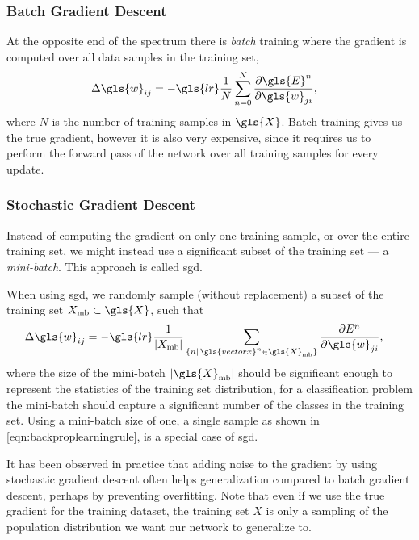 \documentclass[thesis]{subfiles}
\begin{document}
\subsubsection{Batch Gradient Descent}
At the opposite end of the spectrum there is \emph{batch} training where the gradient is computed over all data samples in the training set,
\begin{equation}
\begin{aligned}
    \Delta \gls{w}_{ij} &= -\gls{lr}\frac{1}{N} \sum^N_{n=0} \frac{\partial \gls{E}^n}{\partial \gls{w}_{ji}},
     \label{eqn:batchlearningrule}
\end{aligned}
\end{equation}
%
where $N$ is the number of training samples in $\gls{X}$. Batch training gives us the true gradient, however it is also very expensive, since it requires us to perform the forward pass of the network over all training samples for every update. 

\subsubsection{Stochastic Gradient Descent}
Instead of computing the gradient on only one training sample, or over the entire training set, we might instead use a significant subset of the training set --- a \emph{mini-batch}. This approach is called \gls{sgd}.

When using \gls{sgd}, we randomly sample (without replacement) a subset of the training set $X_{\textrm{mb}} \subset \gls{X}$, such that
\begin{equation}
\begin{aligned}
    \Delta \gls{w}_{ij} &= -\gls{lr} \frac{1}{|X_{\textrm{mb}}|} \sum_{\{n|\,\gls{vectorx}^n \in \gls{X}_{\textrm{mb}}\}} \frac{\partial E^n}{\partial \gls{w}_{ji}},
     \label{eqn:sgdrule}
\end{aligned}
\end{equation}
where the size of the mini-batch $|\gls{X}_{\textrm{mb}}|$ should be significant enough to represent the statistics of the training set distribution, \ie for a classification problem the mini-batch should capture a significant number of the classes in the training set. Using a mini-batch size of one, \ie a single sample as shown in \cref{eqn:backproplearningrule}, is a special case of \gls{sgd}. 

It has been observed in practice that adding noise to the gradient by using stochastic gradient descent often helps generalization compared to batch gradient descent, perhaps by preventing overfitting. Note that even if we use the true gradient for the training dataset, the training set $X$ is only a sampling of the population distribution we want our network to generalize to.
\end{document}

